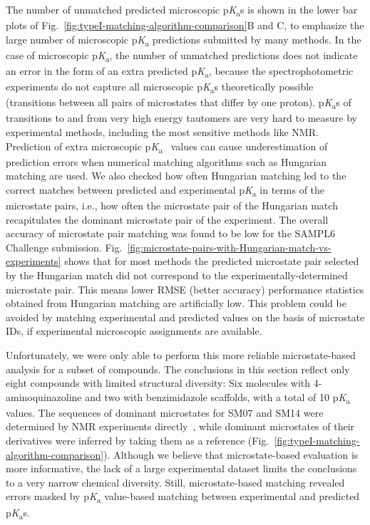 \documentclass[9pt,lineno,final]{elife}
\newcommand{\pKa}{p\textit{K}\textsubscript{a}}
\begin{document}
The number of unmatched predicted microscopic \pKa{s} is shown in the lower bar plots of Fig.~\ref{fig:typeI-matching-algorithm-comparison}B and C, to emphasize the large number of microscopic \pKa{} predictions submitted by many methods. 
In the case of microscopic \pKa{}, the number of unmatched predictions does not indicate an error in the form of an extra predicted \pKa{}, because the spectrophotometric experiments do not capture all microscopic \pKa{}s theoretically possible (transitions between all pairs of microstates that differ by one proton). 
\pKa{}s of transitions to and from very high energy tautomers are very hard to measure by experimental methods, including the most sensitive methods like NMR. 
Prediction of extra microscopic \pKa{}~ values can cause underestimation of prediction errors when numerical matching algorithms such as Hungarian matching are used. 
We also checked how often Hungarian matching led to the correct matches between predicted and experimental \pKa{} in terms of the microstate pairs, i.e., how often the microstate pair of the Hungarian match recapitulates the dominant microstate pair of the experiment. 
The overall accuracy of microstate pair matching was found to be low for the SAMPL6 Challenge submission. 
Fig.~\ref{fig:microstate-pairs-with-Hungarian-match-vs-experiments} shows that for most methods the predicted microstate pair selected by the Hungarian match did not correspond to the experimentally-determined microstate pair.
This means lower RMSE (better accuracy) performance statistics obtained from Hungarian matching are artificially low. 
This problem could be avoided by matching experimental and predicted values on the basis of microstate IDs, if experimental microscopic assignments are available.  

Unfortunately, we were only able to perform this more reliable microstate-based analysis for a subset of compounds.
The conclusions in this section reflect only eight compounds with limited structural diversity: 
Six molecules with 4-aminoquinazoline and two with benzimidazole scaffolds, with a total of 10 \pKa{} values. 
The sequences of dominant microstates for SM07 and SM14 were determined by NMR experiments directly~\citep{Isik:2018:J.Comput.AidedMol.Des.}, while dominant microstates of their derivatives were inferred by taking them as a reference (Fig.~\ref{fig:typeI-matching-algorithm-comparison}). 
Although we believe that microstate-based evaluation is more informative, the lack of a large experimental dataset limits the conclusions to a very narrow chemical diversity. 
Still, microstate-based matching revealed errors masked by \pKa{} value-based matching between experimental and predicted \pKa{}s.
\end{document}
